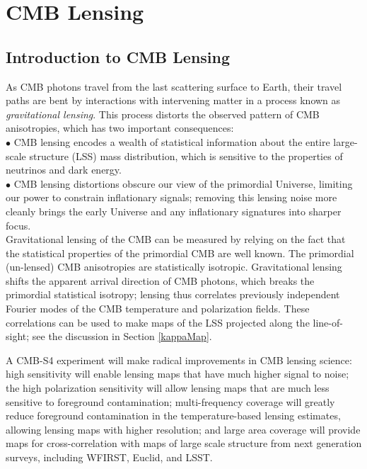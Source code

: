\documentclass{tcibook}
\begin{document}
\chapter{CMB Lensing}
\renewcommand*\thesection{\arabic{section}}


\def\nnu{N_{\mathrm eff}}
\def\gtrsim{\raise-.75ex\hbox{$\buildrel>\over\sim$}}

\section{Introduction to CMB Lensing}
\label{sec:lensing_intro}

As CMB photons travel from the last scattering surface to Earth, their travel paths are bent by interactions with intervening matter in a process known as \textit{gravitational lensing}.
This process distorts the observed pattern of CMB anisotropies, which has two important consequences:\\
 
$\bullet$ CMB lensing encodes a wealth of statistical information about the entire large-scale structure (LSS) mass distribution, which is sensitive to the properties of neutrinos and dark energy.\\

$\bullet$ CMB lensing distortions obscure our view of the primordial Universe, limiting our power to constrain inflationary signals; removing this lensing noise more cleanly brings the early Universe and any inflationary signatures into sharper focus.\\


Gravitational lensing of the CMB can be measured by relying on the fact that the statistical properties of the primordial CMB are well known.
The primordial (un-lensed) CMB anisotropies are statistically isotropic.
Gravitational lensing shifts the apparent arrival direction of CMB photons, which breaks the primordial statistical isotropy;
lensing thus correlates previously independent Fourier modes of the CMB temperature and polarization fields.
These correlations can be used to make maps of the LSS projected along the line-of-sight; see the discussion in Section \ref{kappaMap}.

A CMB-S4 experiment will make radical improvements in CMB lensing science:
high sensitivity will enable lensing maps that have much higher signal to
noise; the high polarization sensitivity will allow
lensing maps that are much less sensitive to foreground contamination;
multi-frequency coverage will greatly reduce foreground 
contamination in the temperature-based lensing estimates, 
allowing lensing maps with higher resolution; and
large area coverage will provide maps for cross-correlation with maps of large
scale structure from next generation surveys, including WFIRST, Euclid, and LSST.
\end{document}
